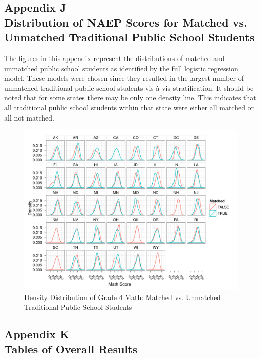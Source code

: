 \documentclass[letterpaper,12pt]{article}
\begin{document}
\cleardoublepage
{}
\subsection*{Appendix J\\Distribution of NAEP Scores for Matched vs. Unmatched Traditional Public School Students}
\label{appendixPublicDensity}

The figures in this appendix represent the distributions of matched and unmatched public school students as identified by the full logistic regression model. These models were chosen since they resulted in the largest number of unmatched traditional public school students vis-\`a-vis stratification. It should be noted that for some states there may be only one density line. This indicates that all traditional public school students within that state were either all matched or all not matched.

\begin{figure}[h]
\begin{center}
\includegraphics[width=\textwidth,angle=90]{../Figures/g4mathlrPublicDensity.pdf}
\caption{Density Distribution of Grade 4 Math: Matched vs. Unmatched Traditional Public School Students}
\label{fig:g4reading:publicdensity}
\end{center}
\end{figure}
\clearpage


\cleardoublepage
{}
\subsection*{Appendix K\\Tables of Overall Results}
\label{appendixOverallResultsTables}




\end{document}
